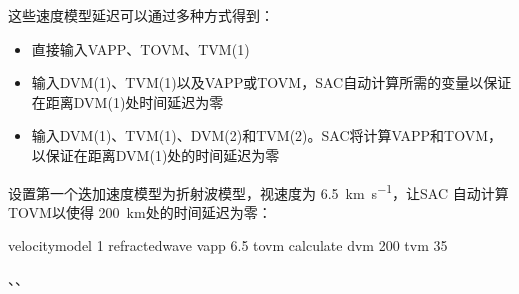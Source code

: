 这些速度模型延迟可以通过多种方式得到：
\begin{itemize}
\item 直接输入VAPP、TOVM、TVM(1)
\item 输入DVM(1)、TVM(1)以及VAPP或TOVM，SAC自动计算所需的变量以保证在距离DVM(1)处时间延迟为零
\item 输入DVM(1)、TVM(1)、DVM(2)和TVM(2)。SAC将计算VAPP和TOVM，以保证在距离DVM(1)处的时间延迟为零
\end{itemize}

设置第一个迭加速度模型为折射波模型，视速度为 \SI{6.5}{\km\per\s}，让SAC
自动计算TOVM以使得 \SI{200}{\km}处的时间延迟为零：
\begin{SACCode}
velocitymodel 1 refractedwave vapp 6.5 tovm calculate dvm 200 tvm 35
\end{SACCode}

、、
